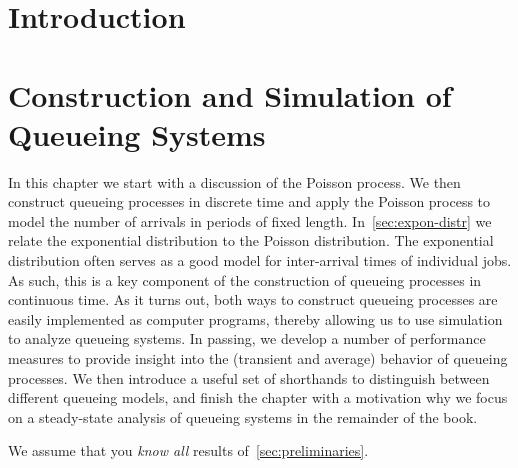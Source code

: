 \author{Nicky D. van  Foreest}


\frontmatter
\maketitle

\tableofcontents

\chapter{Introduction}
\label{cha:introduction}



\mainmatter

\chapter{Construction and Simulation of Queueing Systems}
\label{cha:single-stat-queu}

In this chapter we start with a discussion of the Poisson process.
We then construct queueing processes in discrete time and apply the Poisson process to model the number of arrivals in periods of fixed length.
In~\cref{sec:expon-distr} we relate the exponential distribution to the Poisson distribution.
The exponential distribution often serves as a good model for inter-arrival times of individual jobs.
As such, this is a key component of the construction of queueing processes in continuous time.
As it turns out, both ways to construct queueing processes are easily implemented as computer programs, thereby allowing us to use simulation to analyze queueing systems.
In passing, we develop a number of performance measures to provide insight into the (transient and average) behavior of queueing processes.
We then introduce a useful set of shorthands to distinguish between different queueing models, and finish the chapter with a motivation why we focus on a steady-state analysis of queueing systems in the remainder of the book.

We assume that you  \emph{know all} results of~\cref{sec:preliminaries}. 









